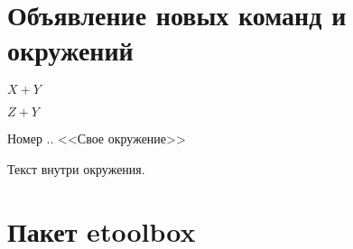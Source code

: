 \section{Объявление новых команд и окружений}
\newcommand{\nw}{\ensuremath{\succcurlyeq}}

\newcommand{\customcommand}[2][X]{
    $#1 + #2$
}

\customcommand{Y}
\customcommand[Z]{Y}


\newenvironment{customenv}[1]{
    \addtocounter{customcounter}{1}%
    Номер \thesection.. <<#1>> %
}%
{\vspace{0cm}} %

\begin{customenv}{Свое окружение}
    Текст внутри окружения.
\end{customenv}

\section{Пакет etoolbox}


\listoffigures

\listoftables


